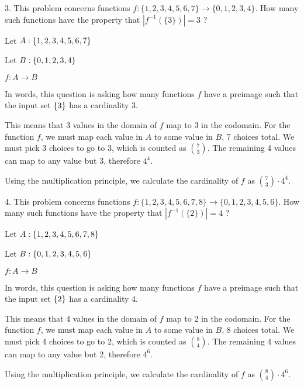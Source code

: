 \documentclass{article}
\begin{document}
\begin{exercise}{}{}
	{3. This problem concerns functions $f:\{1,2,3,4,5,6,7\}
			\rightarrow\{0,1,2,3,4\}$. How many such functions have the property that
		$\left|f^{-1}(\{3\})\right|=3$ ?}
	\begin{alist}
		\item Let $A:\{1,2,3,4,5,6,7\}$
		\item Let $B:\{0,1,2,3,4\}$
		\item $f:A\rightarrow B$
		\item In words, this question is asking how many functions $f$ have a preimage
		such that the input set $\{3\}$ has a cardinality 3.
		\item This means that 3 values in the domain of $f$ map to 3 in the codomain.
		For the function $f$, we must map each value in $A$ to some value in $B$, 7
		choices total.  We must pick 3 choices to go to 3, which is counted as
		$\binom{7}{3}$. The remaining 4 values can map to any value but 3, therefore
		$4^4$.
		\item Using the multiplication principle, we calculate the cardinality of $f$ as
		$\binom{7}{3}\cdot 4^4$.
	\end{alist}
\end{exercise}{}{}

\begin{exercise}{}{}
	{4. This problem concerns functions $f:\{1,2,3,4,5,6,7,8\}
			\rightarrow\{0,1,2,3,4,5,6\}$. How many such functions have the property
		that $\left|f^{-1}(\{2\})\right|=4$ ?}
	\begin{alist}
		\item Let $A:\{1,2,3,4,5,6,7, 8\}$
		\item Let $B:\{0,1,2,3,4, 5, 6\}$
		\item $f:A\rightarrow B$
		\item In words, this question is asking how many functions $f$ have a preimage
		such that the input set $\{2\}$ has a cardinality 4.
		\item This means that 4 values in the domain of $f$ map to 2 in the codomain.
		For the function $f$, we must map each value in $A$ to some value in $B$, 8
		choices total.  We must pick 4 choices to go to 2, which is counted as
		$\binom{8}{4}$. The remaining 4 values can map to any value but 2, therefore
		$4^6$.
		\item Using the multiplication principle, we calculate the cardinality of $f$ as
		$\binom{8}{4}\cdot 4^6$.
	\end{alist}
\end{exercise}{}{}
\end{document}
